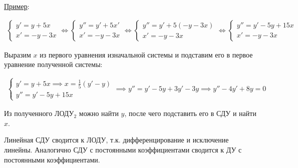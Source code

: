 \underline{Пример}:

\begin{align*}
  \begin{cases}
    y' = y + 5x \\
    x' = -y - 3x
  \end{cases} \iff
  \begin{cases}
    y'' = y' + 5x' \\
    x' = -y - 3x
  \end{cases} \iff
  \begin{cases}
    y'' = y' + 5 (-y - 3x) \\
    x' = -y - 3x
  \end{cases} \iff
  \begin{cases}
    y'' = y' - 5y + 15x \\
    x' = -y - 3x
  \end{cases}
\end{align*}

Выразим \(x\) из первого уравнения изначальной системы и подставим его в первое
уравнение полученной системы:

\begin{align*}
  \begin{cases}
    y' = y + 5x \implies x = \frac{1}{5} (y' - y) \\
    y'' = y' - 5y + 15x 
  \end{cases}
  \implies y'' = y' - 5y + 3y' - 3y 
  \implies y'' - 4y' + 8y = 0
\end{align*}

Из полученного ЛОДУ\(_2\) можно найти \(y\), после чего подставить его в СДУ и
найти \(x\).

\begin{remark}
  Линейная СДУ сводится к ЛОДУ, т.к. дифференцирование и исключение линейны.
  Аналогично СДУ с постоянными коэффициентами сводится к ДУ с постоянными
  коэффициентами.
\end{remark}

